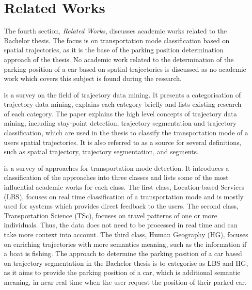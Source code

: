 \section{Related Works}
The fourth section, \textit{Related Works}, discusses academic works related to the Bachelor thesis. The focus is on transportation mode classification based on spatial trajectories, as it is the base of the parking position determination approach of the thesis. No academic work related to the determination of the parking position of a car based on spatial trajectories is discussed as no academic work which covers this subject is found during the research.

\cite{Zheng:2015:TDM:2764959.2743025} is a survey on the field of trajectory data mining. It presents a categorisation of trajectory data mining, explains each category briefly and lists existing research of each category.\newline
The paper explains the high level concepts of trajectory data mining, including stay-point detection, trajectory segmentation and trajectory classification, which are used in the thesis to classify the transportation mode of a users spatial trajectories. It is also referred to as a source for several definitions, such as spatial trajectory, trajectory segmentation, and segments.

\cite{Prelipcean2017} is a survey of approaches for transportation mode detection. It introduces a classification of the approaches into three classes and lists some of the most influential academic works for each class. The first class, Location-based Services (LBS), focuses on real time classification of a transportation mode and is mostly used for systems which provides direct feedback to the users. The second class, Transportation Science (TSc), focuses on travel patterns of one or more individuals. Thus, the data does not need to be processed in real time and can take more context into account. The third class, Human Geography (HG), focuses on enriching trajectories with more semantics meaning, such as the information if a boat is fishing.\newline
The approach to determine the parking position of a car based on trajectory segmentation in the Bachelor thesis is to categorise as LBS and HG, as it aims to provide the parking position of a car, which is additional semantic meaning, in near real time when the user request the position of their parked car. 

